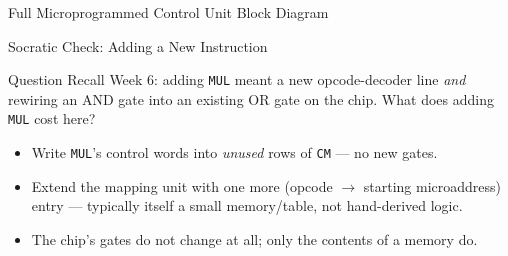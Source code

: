 \documentclass[aspectratio=169]{beamer}
\begin{document}
\begin{frame}{Full Microprogrammed Control Unit Block Diagram}
\begin{center}
  \end{center}
  \cite{Mano1993_computer_system_architecture,Hamacher2002_computer_organization}
\end{frame}

\begin{frame}{Socratic Check: Adding a New Instruction}
  \begin{alertblock}{Question}
    Recall Week 6: adding \texttt{MUL} meant a new opcode-decoder line
    \emph{and} rewiring an AND gate into an existing OR gate on the chip.
    What does adding \texttt{MUL} cost here?
  \end{alertblock}
  \begin{itemize}
    \item Write \texttt{MUL}'s control words into \emph{unused} rows of
      \texttt{CM} --- no new gates.
    \item Extend the mapping unit with one more (opcode $\to$ starting
      microaddress) entry --- typically itself a small memory/table, not
      hand-derived logic.
    \item The chip's gates do not change at all; only the contents of a
      memory do.
  \end{itemize}
\end{frame}
\end{document}
